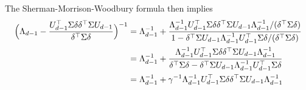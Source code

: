 \documentclass[10pt]{article}
\begin{document}
The Sherman-Morrison-Woodbury formula then implies
\begin{equation*}
\begin{split}
\Bigl(\Lambda_{d-1} - \frac{U_{d-1}^{\top} \Sigma \delta \delta^{\top} \Sigma U_{d-1}}{\delta^{\top} \Sigma \delta} \Bigr)^{-1} & = \Lambda_{d-1}^{-1} + \frac{\Lambda_{d-1}^{-1} U_{d-1}^{\top} \Sigma \delta \delta^{\top} \Sigma U_{d-1} \Lambda_{d-1}^{-1} /(\delta^{\top} \Sigma \delta)}{1 - \delta^{\top} \Sigma U_{d-1} \Lambda_{d-1}^{-1} U_{d-1}^{\top} \Sigma \delta/(\delta^{\top} \Sigma \delta)} \\
&= \Lambda_{d-1}^{-1} + \frac{\Lambda_{d-1}^{-1} U_{d-1}^{\top} \Sigma \delta \delta^{\top} \Sigma U_{d-1} \Lambda_{d-1}^{-1}}{\delta^{\top} \Sigma \delta - \delta^{\top} \Sigma U_{d-1} \Lambda_{d-1}^{-1} U_{d-1}^{\top} \Sigma \delta} \\
&= \Lambda_{d-1}^{-1} + \gamma^{-1} \Lambda_{d-1}^{-1} U_{d-1}^{\top} \Sigma \delta \delta^{\top} \Sigma U_{d-1} \Lambda_{d-1}^{-1}
\end{split}
\end{equation*}
\end{document}
